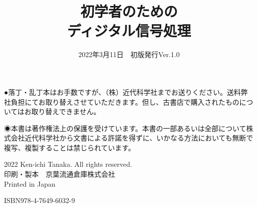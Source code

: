 \backmatter
\begin{colophon}
\begin{info}
●落丁・乱丁本はお手数ですが、（株）近代科学社までお送りください。送料弊社負担にてお取り替えさせていただきます。但し、古書店で購入されたものについてはお取り替えできません。
\end{info}
\title{初学者のための\\ディジタル信号処理}
\date{2022年3月11日　初版発行Ver.1.0}
\begin{dlist}

\end{dlist}
\begin{notice}◉本書は著作権法上の保護を受けています。本書の一部あるいは全部について株式会社近代科学社から文書による許諾を得ずに、いかなる方法においても無断で複写、複製することは禁じられています。\end{notice}
\begin{copyright}{\textcopyright}2022 Ken-ichi Tanaka. All rights reserved.\\印刷・製本　京葉流通倉庫株式会社\\Printed in Japan\end{copyright}
\begin{isbncode}ISBN978-4-7649-6032-9\end{isbncode}



\end{colophon}

